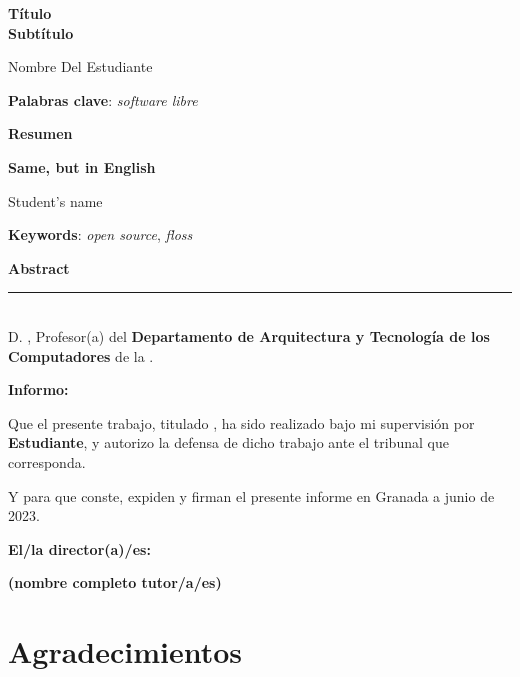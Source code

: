 \thispagestyle{empty}

\begin{center}
{\large\bfseries Título \\ Subtítulo }\\
\end{center}
\begin{center}
Nombre Del Estudiante\\
\end{center}


\vspace{0.5cm}
\noindent\textbf{Palabras clave}: \textit{software libre}
\vspace{0.7cm}

\noindent\textbf{Resumen}\\
	

\cleardoublepage

\begin{center}
	{\large\bfseries Same, but in English}\\
\end{center}
\begin{center}
	Student's name\\
\end{center}
\vspace{0.5cm}
\noindent\textbf{Keywords}: \textit{open source}, \textit{floss}
\vspace{0.7cm}

\noindent\textbf{Abstract}\


\cleardoublepage

\thispagestyle{empty}

\noindent\rule[-1ex]{\textwidth}{2pt}\\[4.5ex]

D. \textbf{\tutor}, Profesor(a) del \textbf{Departamento de Arquitectura y Tecnología de los Computadores} de la \textbf{\universidad}.

\vspace{0.5cm}

\textbf{Informo:}

\vspace{0.5cm}

Que el presente trabajo, titulado \textit{\textbf{\titulo}},
ha sido realizado bajo mi supervisión por \textbf{Estudiante},
 y autorizo la defensa de dicho trabajo ante el tribunal que corresponda.

\vspace{0.5cm}

Y para que conste, expiden y firman el presente informe en Granada a junio de 2023.

\vspace{1cm}

\textbf{El/la director(a)/es: }

\vspace{5cm}

\noindent \textbf{(nombre completo tutor/a/es)}

\chapter*{Agradecimientos}




